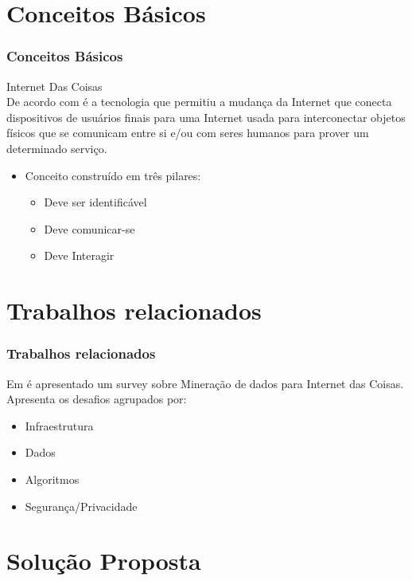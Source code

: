 \documentclass[hyperref={pdfpagelabels=false}]{beamer}
\begin{document}
\section{Conceitos Básicos}

\begin{frame}
	\frametitle{Conceitos Básicos}
    
    \Large{Internet Das Coisas} \\
    
    \normalsize{De acordo com \cite{000-004}} é a tecnologia que permitiu a mudança da Internet que conecta dispositivos de usuários finais para uma Internet usada para interconectar objetos físicos que se comunicam entre si e/ou com seres humanos para prover um determinado serviço.
    \begin{itemize}
	    \item \normalsize{Conceito construído em três pilares:} \begin{itemize}
		    \item Deve ser identificável
            \item Deve comunicar-se
            \item Deve Interagir
		    \end{itemize}
        
    \end{itemize}

\end{frame}

\section {Trabalhos relacionados}

\begin{frame}
	\frametitle{Trabalhos relacionados}
    
    Em \cite{000-000} é apresentado um survey sobre Mineração de dados para Internet das Coisas. \\
    Apresenta os desafios agrupados por:
	\begin{itemize}
		\item Infraestrutura
        \item Dados
        \item Algoritmos
        \item Segurança/Privacidade
	\end{itemize}

\end{frame}

\section{Solução Proposta}
\end{document}
